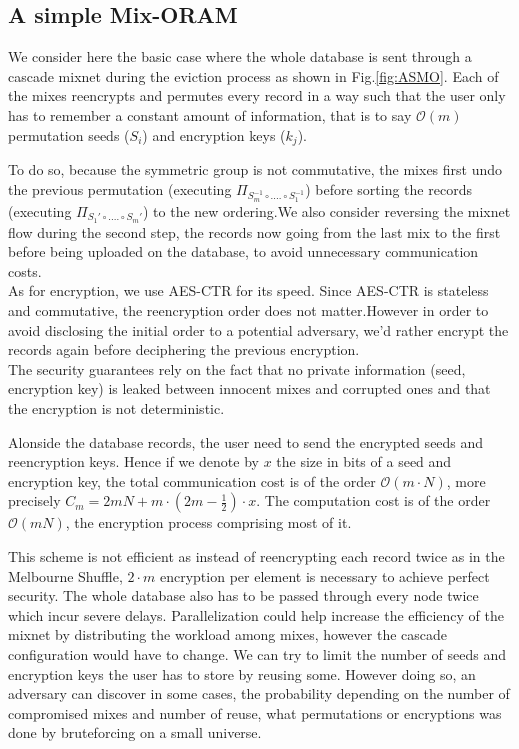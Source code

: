 \documentclass[conference]{IEEEtran}
\begin{document}
\subsection{A simple Mix-ORAM}
We consider here the basic case where the whole database is sent through a cascade mixnet during the eviction process as shown in Fig.\ref{fig:ASMO}.
Each of the mixes reencrypts and permutes every record in a way such that the user only has to remember a constant amount of information, that is to say $\mathcal{O}\left ( m \right )$ permutation seeds ($S_i$) and encryption keys ($k_j$).

To do so, because the symmetric group is not commutative, the mixes first undo the previous permutation (executing $\Pi_{S_m^{-1} \circ .... \circ S_1^{-1}}$) before sorting the records (executing $\Pi_{S_1' \circ .... \circ S_m'}$) to the new ordering.We also consider reversing the mixnet flow during the second step, the records now going from the last mix to the first before being uploaded on the database, to avoid unnecessary communication costs.\\
As for encryption, we use AES-CTR for its speed. Since AES-CTR is stateless and commutative, the reencryption order does not matter.However in order to avoid disclosing the initial order to a potential adversary, we'd rather encrypt the records again before deciphering the previous encryption.\\
The security guarantees rely on the fact that no private information (seed, encryption key) is leaked between innocent mixes and corrupted ones and that the encryption is not deterministic.

Alonside the database records, the user need to send the encrypted seeds and reencryption keys. Hence if we denote by $x$ the size in bits of a seed and encryption key, the total communication cost is of the order $\mathcal{O}\left ( m\cdot N \right )$, more precisely $C_m=2mN + m\cdot(2m-\frac{1}{2})\cdot x$.
The computation cost is of the order $\mathcal{O}\left(mN\right)$, the encryption process comprising most of it.

This scheme is not efficient as instead of reencrypting each record twice as in the Melbourne Shuffle, $2\cdot m$ encryption per element is necessary to achieve perfect security. The whole database also has to be passed through every node twice which incur severe delays. Parallelization could help increase the efficiency of the mixnet by distributing the workload among mixes, however the cascade configuration would have to change.
We can try to limit the number of seeds and encryption keys the user has to store by reusing some. However doing so, an adversary can discover in some cases, the probability depending on the number of compromised mixes and number of reuse, what permutations or encryptions was done by bruteforcing on a small universe.
\end{document}
